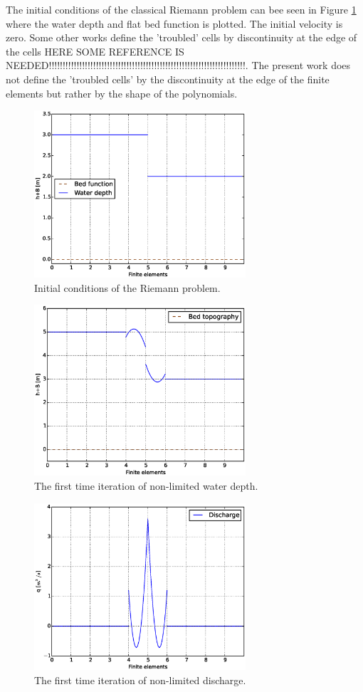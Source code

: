 The initial conditions of the classical Riemann problem can bee seen in Figure \ref{riemann} where the water depth and flat bed function is plotted. The initial velocity is zero. Some other works define the ’troubled’ cells by discontinuity at the edge of the cells HERE SOME REFERENCE IS NEEDED!!!!!!!!!!!!!!!!!!!!!!!!!!!!!!!!!!!!!!!!!!!!!!!!!!!!!!!!!!!!!!!!!!!!!!!. The present work does not define the ’troubled cells’ by the discontinuity at the edge of the finite elements but rather by the shape of the polynomials.
\begin{figure}
\centering
\includegraphics[width=0.7\textwidth]{OBR/riemann.eps}
\caption{Initial conditions of the Riemann problem.}\label{riemann}
\end{figure}
\begin{figure}
\centering
\includegraphics[width=0.7\textwidth]{OBR/first.eps}
\caption{The first time iteration of non-limited water depth.}\label{first}
\end{figure}
\begin{figure}
\centering
\includegraphics[width=0.7\textwidth]{OBR/HU.eps}
\caption{The first time iteration of non-limited discharge.}\label{HU}
\end{figure}
